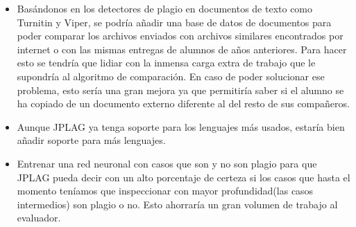 \begin{itemize}
\item Basándonos en los detectores de plagio en documentos de texto como Turnitin y Viper, se podría añadir una base de datos de documentos para poder comparar los archivos enviados con archivos similares encontrados por internet o con las mismas entregas de alumnos de años anteriores. Para hacer esto se tendría que lidiar con la inmensa carga extra de trabajo que le supondría al algoritmo de comparación. En caso de poder solucionar ese problema, esto sería una gran mejora ya que permitiría saber si el alumno se ha copiado de un documento externo diferente al del resto de sus compañeros.
\item Aunque JPLAG ya tenga soporte para los lenguajes más usados, estaría bien añadir soporte para más lenguajes.
\item Entrenar una red neuronal con casos que son y no son plagio para que JPLAG pueda decir con un alto porcentaje de certeza si los casos que hasta el momento teníamos que inspeccionar con mayor profundidad(las casos intermedios) son plagio o no. Esto ahorraría un gran volumen de trabajo al evaluador.
\end{itemize}













